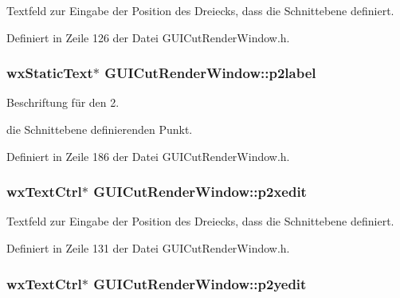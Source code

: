 Textfeld zur Eingabe der Position des Dreiecks, dass die Schnittebene definiert. 



Definiert in Zeile 126 der Datei G\-U\-I\-Cut\-Render\-Window.\-h.

\hypertarget{classGUICutRenderWindow_adc1202b42f220ea7b8a8830f4d9d322a}{
\subsubsection[{p2label}]{\setlength{\rightskip}{0pt plus 5cm}wx\-Static\-Text$\ast$ G\-U\-I\-Cut\-Render\-Window\-::p2label\hspace{0.3cm}{\ttfamily [private]}}}\label{classGUICutRenderWindow_adc1202b42f220ea7b8a8830f4d9d322a}


Beschriftung für den 2. 

die Schnittebene definierenden Punkt. 

Definiert in Zeile 186 der Datei G\-U\-I\-Cut\-Render\-Window.\-h.

\hypertarget{classGUICutRenderWindow_a5d2bcd96c6fdb8d629583c5d40ccdbcc}{
\subsubsection[{p2xedit}]{\setlength{\rightskip}{0pt plus 5cm}wx\-Text\-Ctrl$\ast$ G\-U\-I\-Cut\-Render\-Window\-::p2xedit\hspace{0.3cm}{\ttfamily [private]}}}\label{classGUICutRenderWindow_a5d2bcd96c6fdb8d629583c5d40ccdbcc}


Textfeld zur Eingabe der Position des Dreiecks, dass die Schnittebene definiert. 



Definiert in Zeile 131 der Datei G\-U\-I\-Cut\-Render\-Window.\-h.

\hypertarget{classGUICutRenderWindow_a8ec4550ec7d30a8ad3c4c1e5dfcb8dce}{
\subsubsection[{p2yedit}]{\setlength{\rightskip}{0pt plus 5cm}wx\-Text\-Ctrl$\ast$ G\-U\-I\-Cut\-Render\-Window\-::p2yedit\hspace{0.3cm}{\ttfamily [private]}}}\label{classGUICutRenderWindow_a8ec4550ec7d30a8ad3c4c1e5dfcb8dce}



